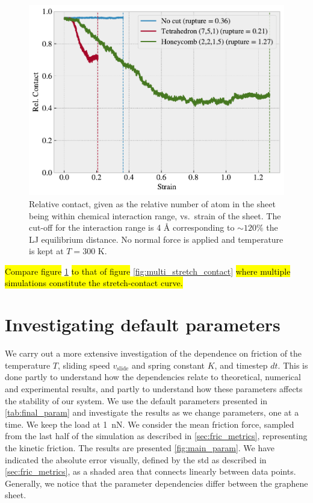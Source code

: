 \begin{figure}[H]
  \centering
  \includegraphics[width=0.6\linewidth]{figures/baseline/contact_vs_stretch.pdf}
  \caption{Relative contact, given as the relative number of atom in the sheet being within chemical interaction range, vs.\ strain of the sheet.  The cut-off for the interaction range is 4 Å corresponding to $\sim 120 \%$ the LJ equilibrium distance. No normal force is applied and temperature is kept at $T = 300$ K.}
  \label{fig:contact_vs_stretch}
\end{figure}

\hl{Compare figure} \cref{fig:contact_vs_stretch} \hl{to that of figure} \cref{fig:multi_stretch_contact} \hl{where multiple simulations constitute the stretch-contact curve.}


\section{Investigating default parameters}\label{sec:main_params}
We carry out a more extensive investigation of the dependence on friction of the temperature $T$, sliding speed $v_{\text{slide}}$ and spring
constant $K$, and timestep $dt$. This is done partly to
understand how the dependencies relate to theoretical, numerical and
experimental results, and partly to understand how these parameters affects
the stability of our system. We use the default parameters presented in
\cref{tab:final_param} and investigate the results as we change parameters, one at a time. We keep the load at \SI{1}{nN}. We consider the mean
friction force, sampled from the last half of the simulation as described in
\cref{sec:fric_metrics}, representing the kinetic friction. The results are
presented \cref{fig:main_param}. We have indicated the absolute error visually,
defined by the \acrshort{std} as described in \cref{sec:fric_metrics}, as a
shaded area that connects linearly between data points. Generally, we notice
that the parameter dependencies differ between the graphene sheet. 


